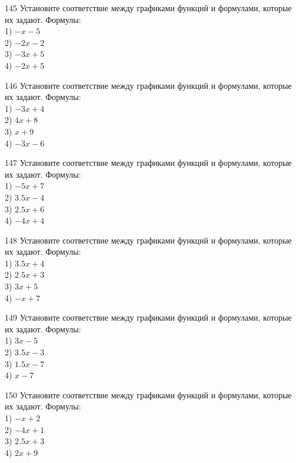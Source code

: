 \documentclass[4apaper]{article}
\begin{document}
\begin{taskBN}{145}
Установите соответствие между графиками функций и формулами, которые их задают. Формулы: \\1) $-x-5$\\2) $-2x-2$\\3) $-3x+5$\\4) $-2x+5$
\end{taskBN}

\begin{taskBN}{146}
Установите соответствие между графиками функций и формулами, которые их задают. Формулы: \\1) $-3x+4$\\2) $4x+8$\\3) $x+9$\\4) $-3x-6$
\end{taskBN}

\begin{taskBN}{147}
Установите соответствие между графиками функций и формулами, которые их задают. Формулы: \\1) $-5x+7$\\2) $3.5x-4$\\3) $2.5x+6$\\4) $-4x+4$
\end{taskBN}

\begin{taskBN}{148}
Установите соответствие между графиками функций и формулами, которые их задают. Формулы: \\1) $3.5x+4$\\2) $2.5x+3$\\3) $3x+5$\\4) $-x+7$
\end{taskBN}

\begin{taskBN}{149}
Установите соответствие между графиками функций и формулами, которые их задают. Формулы: \\1) $3x-5$\\2) $3.5x-3$\\3) $1.5x-7$\\4) $x-7$
\end{taskBN}

\begin{taskBN}{150}
Установите соответствие между графиками функций и формулами, которые их задают. Формулы: \\1) $-x+2$\\2) $-4x+1$\\3) $2.5x+3$\\4) $2x+9$
\end{taskBN}
\end{document}
